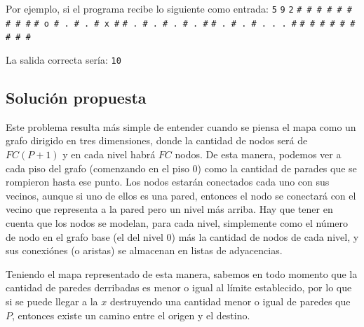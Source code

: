        Por ejemplo, si el programa recibe lo siguiente como entrada: \newline
        \texttt{5} \texttt{9} \texttt{2} \newline
        \texttt{\# \# \# \# \# \# \# \# \#} \newline
        \texttt{\# o \# . \# . \# x \#} \newline
        \texttt{\# . \# . \# . \# . \#} \newline
        \texttt{\# . \# . \# . . . \#} \newline
        \texttt{\# \# \# \# \# \# \# \# \#} \newline

        La salida correcta sería: \newline
        \texttt{10}

    \subsection{Solución propuesta}
        Este problema resulta más simple de entender cuando se piensa el mapa como un grafo dirigido en tres dimensiones, donde la cantidad de nodos será de $FC(P+1)$ y en cada nivel habrá $FC$ nodos. De esta manera, podemos ver a cada piso del grafo (comenzando en el piso 0) como la cantidad de parades que se rompieron hasta ese punto. Los nodos estarán conectados cada uno con sus vecinos, aunque si uno de ellos es una pared, entonces el nodo se conectará con el vecino que representa a la pared pero un nivel más arriba. Hay que tener en cuenta que los nodos se modelan, para cada nivel, simplemente como el número de nodo en el grafo base (el del nivel 0) más la cantidad de nodos de cada nivel, y sus conexiónes (o aristas) se almacenan en listas de adyacencias.

        Teniendo el mapa representado de esta manera, sabemos en todo momento que la cantidad de paredes derribadas es menor o igual al límite establecido, por lo que si se puede llegar a la $x$ destruyendo una cantidad menor o igual de paredes que $P$, entonces existe un camino entre el origen y el destino.


